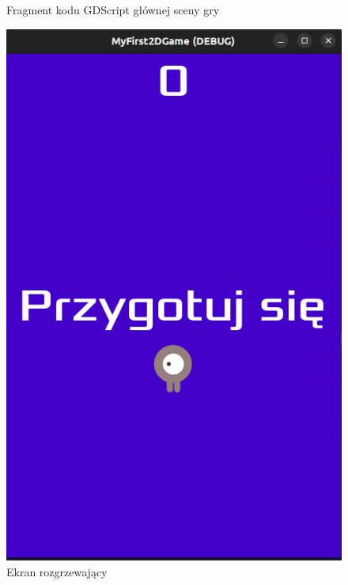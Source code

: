 \documentclass[a4paper]{article}
\begin{document}
\begin{sloppypar}
\begin{center}
\begin{figure}
			\caption{Fragment kodu GDScript głównej sceny gry}
		\end{figure}
		\begin{figure}
			\centering
			\includegraphics[height=0.35\textheight]{get_ready.png}
			\caption{Ekran rozgrzewający}
		\end{figure}
		\begin{figure}
			\centering

\end{figure}
\end{center}
\end{sloppypar}
\end{document}
